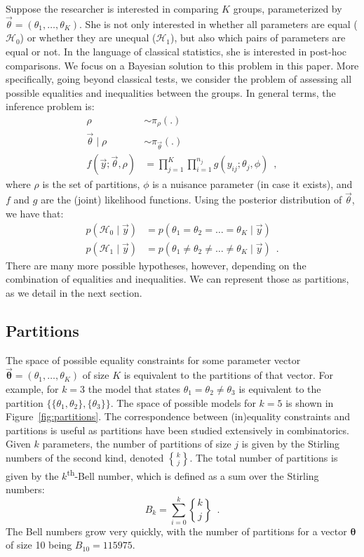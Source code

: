 \documentclass[11pt,a4paper]{article}
\theoremstyle{definition} %
\theoremstyle{case}
\DeclareRobustCommand{\stirling}{\genfrac\{\}{0pt}{}}
\newcommand{\bellnum}[1]{B_{#1}}
\begin{document}
Suppose the researcher is interested in comparing $K$ groups, parameterized by $\vec{\theta} = (\theta_1, \ldots, \theta_K)$. She is not only interested in whether all parameters are equal ($\mathcal{H}_0$) or whether they are unequal ($\mathcal{H}_1$), but also which pairs of parameters are equal or not. In the language of classical statistics, she is interested in post-hoc comparisons. We focus on a Bayesian solution to this problem in this paper. More specifically, going beyond classical tests, we consider the problem of assessing all possible equalities and inequalities between the groups. In general terms, the inference problem is:
\begin{align*}
    \rho &\sim \pi_{\rho}(.) \\
    \vec{\theta} \mid \rho &\sim \pi_{\vec{\theta}}(.) \\
    f(\vec{y}; \vec{\theta}, \rho) &= \prod_{j=1}^K \prod_{i=1}^{n_j} g(y_{ij}; \theta_j, \phi) \enspace ,
\end{align*}
where $\rho$ is the set of partitions, $\phi$ is a nuisance parameter (in case it exists), and $f$ and $g$ are the (joint) likelihood functions. Using the posterior distribution of $\vec{\theta}$, we have that:
\begin{align*}
    p(\mathcal{H}_0 \mid \vec{y}) &= p(\theta_1 = \theta_2 = \ldots = \theta_K \mid \vec{y}) \\
    p(\mathcal{H}_1 \mid \vec{y}) &= p(\theta_1 \neq \theta_2 \neq \ldots \neq \theta_K \mid \vec{y}) \enspace .
\end{align*}
There are many more possible hypotheses, however, depending on the combination of equalities and inequalities. We can represent those as partitions, as we detail in the next section. %


\subsection{Partitions}
The space of possible equality constraints for some parameter vector $\mathbf{\vec{\theta}} = (\theta_1, \ldots, \theta_K)$ of size $K$ is equivalent to the partitions of that vector. For example, for $k = 3$ the model that states $\theta_1 = \theta_2 \neq \theta_3$ is equivalent to the partition $\{\{\theta_1, \theta_2\}, \{\theta_3\}\}$. The space of possible models for $k = 5$ is shown in Figure~\ref{fig:partitions}. The correspondence between (in)equality constraints and partitions is useful as partitions have been studied extensively in combinatorics. Given $k$ parameters, the number of partitions of size $j$ is given by the Stirling numbers of the second kind, denoted $\stirling{k}{j}$. The total number of partitions is given by the $k$\textsuperscript{th}-Bell number, which is defined as a sum over the Stirling numbers:
\begin{equation}
    \bellnum{k} = \sum_{i = 0}^k \stirling{k}{j} \enspace .
\end{equation}
The Bell numbers grow very quickly, with the number of partitions for a vector $\mathbf{\theta}$ of size 10 being $B_{10} = 115975$. %
\end{document}
